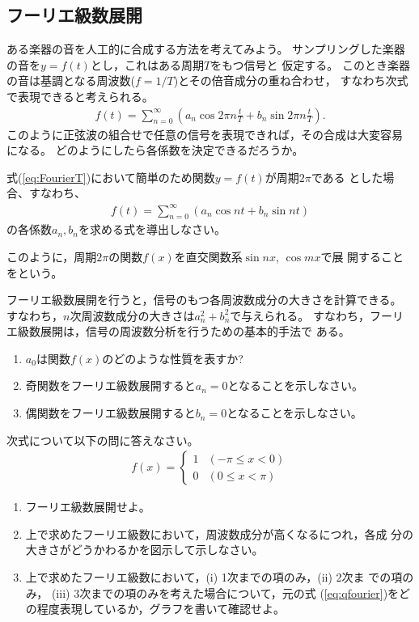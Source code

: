 \documentclass[twocolumn,11pt]{jarticle}
\begin{document}
\subsection{フーリエ級数展開}

ある楽器の音を人工的に合成する方法を考えてみよう。
サンプリングした楽器の音を$y=f(t)$とし，これはある周期$T$をもつ信号と
仮定する。
このとき楽器の音は基調となる周波数($f=1/T$)とその倍音成分の重ね合わせ，
すなわち次式で表現できると考えられる。
\begin{align}
  \label{eq:FourierT}
  f(t)=\sum_{n=0}^{\infty} 
  (a_n\cos 2\pi n\frac{t}{T} + b_n \sin 2\pi n\frac{t}{T}).
\end{align}
このように正弦波の組合せで任意の信号を表現できれば，その合成は大変容易
になる。
どのようにしたら各係数を決定できるだろうか。

\nquestion
式(\ref{eq:FourierT})において簡単のため関数$y=f(t)$が周期$2\pi$である
とした場合、すなわち、
\begin{align}
  f(t)=\sum_{n=0}^{\infty} (a_n\cos nt + b_n \sin nt)
  \label{eq:Fourier2pi}
\end{align}
の各係数$a_n,b_n$を求める式を導出しなさい。

\comment
このように，周期$2\pi$の関数$f(x)$を直交関数系$\sin nx$, $\cos mx$で展
開することをという。

フーリエ級数展開を行うと，信号のもつ各周波数成分の大きさを計算できる。
すなわち，$n$次周波数成分の大きさは$a_n^2+b_n^2$で与えられる。
すなわち，フーリエ級数展開は，信号の周波数分析を行うための基本的手法で
ある。


\nquestion
\begin{enumerate}
\item $a_0$は関数$f(x)$のどのような性質を表すか?
\item 奇関数をフーリエ級数展開すると$a_n=0$となることを示しなさい。
\item 偶関数をフーリエ級数展開すると$b_n=0$となることを示しなさい。
  \end{enumerate}

\exercise
次式について以下の問に答えなさい。
  \begin{align}
    \label{eq:qfourier}
    f(x)=
    \begin{cases}
      1 & (-\pi\le x<0)\\
      0 & (0\le x<\pi)
    \end{cases}
  \end{align}
\begin{enumerate}
\item フーリエ級数展開せよ。
\item 上で求めたフーリエ級数において，周波数成分が高くなるにつれ，各成
  分の大きさがどうかわるかを図示して示しなさい。
\item 上で求めたフーリエ級数において，(i) 1次までの項のみ，(ii) 2次ま
  での項のみ，
  (iii) 3次までの項のみを考えた場合について，元の式
  (\ref{eq:qfourier})をどの程度表現しているか，グラフを書いて確認せよ。
\end{enumerate}
\end{document}
